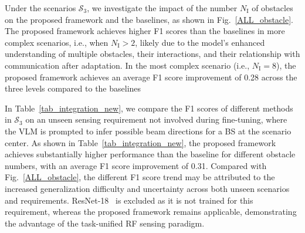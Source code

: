 \documentclass[journal,10pt,twocolumn]{IEEEtran}
\newcommand\SC{\ensuremath{\mathcal{S}}}
\newcommand\IR{\ensuremath{\mathrm{I}}}
\begin{document}
Under the scenarios \( \SC_{3} \), we investigate the impact of the number \( N_{\IR} \) of obstacles on the proposed framework and the baselines, as shown in Fig.~\ref{ALL_obstacle}. The proposed framework achieves higher F1 scores than the baselines in more complex scenarios, i.e., when  \( N_{\IR}>2 \), likely due to the model's enhanced understanding of multiple obstacles, their interactions, and their relationship with communication after adaptation. In the most complex scenario (i.e., \( N_{\IR}=8 \)), the proposed framework achieves an average F1 score improvement of 0.28 across the three levels compared to the baselines


In Table~\ref{tab_integration_new}, we compare the F1 scores of different methods in $\SC_3$ on an unseen sensing requirement not involved during fine-tuning, where the VLM is prompted to infer possible beam directions for a BS at the scenario center. As shown in Table~\ref{tab_integration_new}, the proposed framework achieves substantially higher performance than the baseline for different obstacle numbers, with an average F1 score improvement of 0.31. Compared with Fig.~\ref{ALL_obstacle}, the different F1 score trend may be attributed to the increased generalization difficulty and uncertainty across both unseen scenarios and requirements. ResNet-18~\cite{7780459} is excluded as it is not trained for this requirement, whereas the proposed framework remains applicable, demonstrating the advantage of the task-unified RF sensing paradigm.
\end{document}
